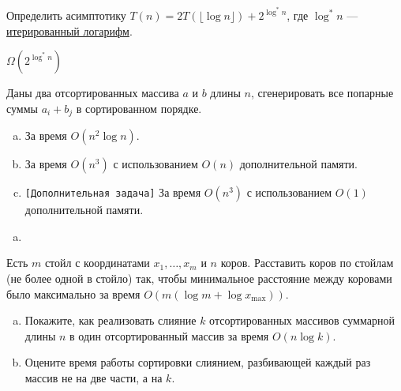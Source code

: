 
\begin{problem}
    Определить асимптотику $T(n) = 2T(\lfloor \log n \rfloor) + 2^{\log^* n}$, где $\log^* n$ ---
    \href{https://en.wikipedia.org/wiki/Iterated_logarithm}{итерированный логарифм}.
\end{problem}

\begin{solution}
    $\Omega(2^{\log^* n})$
\end{solution}


\begin{problem}
    Даны два отсортированных массива $a$ и $b$ длины $n$, сгенерировать все попарные суммы $a_i + b_j$
    в сортированном порядке.
    \begin{enumerate}[a)]
        \item За время $O(n^2 \log n)$.
        \item За время $O(n^3)$ с использованием $O(n)$ дополнительной памяти.
        \item \texttt{[Дополнительная задача]} За время $O(n^3)$ с использованием $O(1)$ дополнительной памяти.
    \end{enumerate}
\end{problem}

\begin{solution}
    \leavevmode\vspace{1pt}
    \begin{enumerate}[a)]
        \item
        
    \end{enumerate}
\end{solution}


\begin{problem}
    Есть $m$ стойл с координатами $x_1, \ldots, x_m$ и $n$ коров. Расставить коров по стойлам (не более одной в стойло) так,
    чтобы минимальное расстояние между коровами было максимально за время $O(m (\log{m} + \log{x_{\max}}))$.
\end{problem}

\begin{solution}
    \leavevmode\vspace{1pt}
    
\end{solution}


\begin{problem}
    \leavevmode\vspace{1pt}
    \begin{enumerate}[a)]
        \item Покажите, как реализовать слияние $k$ отсортированных массивов суммарной длины $n$ в один отсортированный массив за время $O(n \log k)$.
        \item Оцените время работы сортировки слиянием, разбивающей каждый раз массив не на две части, а на $k$.
    \end{enumerate}
\end{problem}

